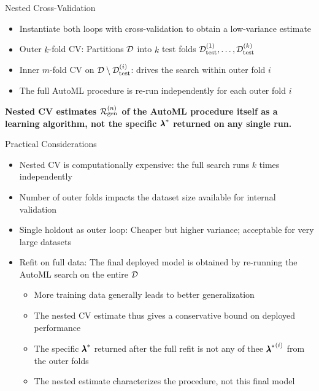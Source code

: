 \documentclass[main]{subfiles}
\begin{document}
\begin{frame}{Nested Cross-Validation}
\begin{itemize}
    \item Instantiate both loops with cross-validation to obtain a low-variance estimate
    \item Outer $k$-fold CV: Partitions $\mathcal{D}$ into $k$ test folds $\mathcal{D}_{\text{test}}^{(1)}, \ldots, \mathcal{D}_{\text{test}}^{(k)}$
    \item Inner $m$-fold CV on $\mathcal{D} \setminus \mathcal{D}_{\text{test}}^{(i)}$: drives the search within outer fold $i$
    \item The full AutoML procedure is re-run independently for each outer fold $i$
\end{itemize}
\vspace{.25cm}
\textbf{Nested CV estimates $\mathcal{R}_{\text{gen}}^{(n)}$ of the AutoML procedure itself as a learning algorithm, not the specific ${\pmb{\lambda}}^*$ returned on any single run.}
    
\end{frame}

\begin{frame}{Practical Considerations}
    \begin{itemize}
        \item Nested CV is computationally expensive: the full search runs $k$ times independently
        \item Number of outer folds impacts the dataset size available for internal validation
        \item Single holdout as outer loop: Cheaper but higher variance; acceptable for very large datasets
    \end{itemize}

    \begin{itemize}
    \item \alert{Refit on full data}: The final deployed model is obtained by re-running the AutoML search on the entire $\mathcal{D}$
    \begin{itemize}
        \item More training data generally leads to better generalization
        \item The nested CV estimate thus gives a conservative bound on deployed performance
        \item The specific ${\pmb{\lambda}}^*$ returned after the full refit is not any of thee ${{\pmb{\lambda}}^*}^{(i)}$ from the outer folds
        \item The nested estimate characterizes the procedure, not this final model
    \end{itemize}
    \end{itemize}
\end{frame}
\end{document}
